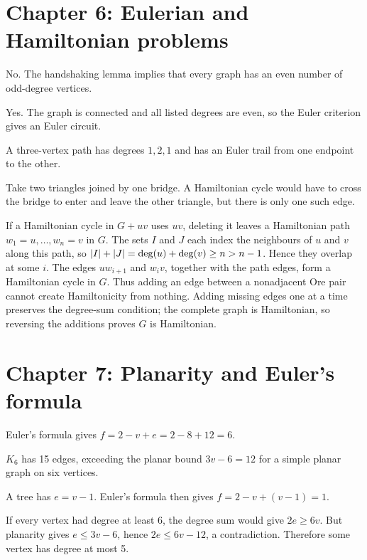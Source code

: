 \section*{Chapter 6: Eulerian and Hamiltonian problems}
\begin{description}[style=nextline]
\item[6.1] No. The handshaking lemma implies that every graph has an even number of odd-degree vertices.
\item[6.2] Yes. The graph is connected and all listed degrees are even, so the Euler criterion gives an Euler circuit.
\item[6.3] A three-vertex path has degrees $1,2,1$ and has an Euler trail from one endpoint to the other.
\item[6.4] Take two triangles joined by one bridge. A Hamiltonian cycle would have to cross the bridge to enter and leave the other triangle, but there is only one such edge.
\item[6.5] If a Hamiltonian cycle in $G+uv$ uses $uv$, deleting it leaves a Hamiltonian path $w_1=u,\ldots,w_n=v$ in $G$. The sets $I$ and $J$ each index the neighbours of $u$ and $v$ along this path, so $|I|+|J|=\operatorname{deg}(u)+\operatorname{deg}(v)\geq n>n-1$. Hence they overlap at some $i$. The edges $uw_{i+1}$ and $w_iv$, together with the path edges, form a Hamiltonian cycle in $G$. Thus adding an edge between a nonadjacent Ore pair cannot create Hamiltonicity from nothing. Adding missing edges one at a time preserves the degree-sum condition; the complete graph is Hamiltonian, so reversing the additions proves $G$ is Hamiltonian.
\end{description}

\section*{Chapter 7: Planarity and Euler's formula}
\begin{description}[style=nextline]
\item[7.1] Euler's formula gives $f=2-v+e=2-8+12=6$.
\item[7.2] $K_6$ has 15 edges, exceeding the planar bound $3v-6=12$ for a simple planar graph on six vertices.
\item[7.3] A tree has $e=v-1$. Euler's formula then gives $f=2-v+(v-1)=1$.
\item[7.4] If every vertex had degree at least 6, the degree sum would give $2e\geq6v$. But planarity gives $e\leq3v-6$, hence $2e\leq6v-12$, a contradiction. Therefore some vertex has degree at most 5.
\end{description}

